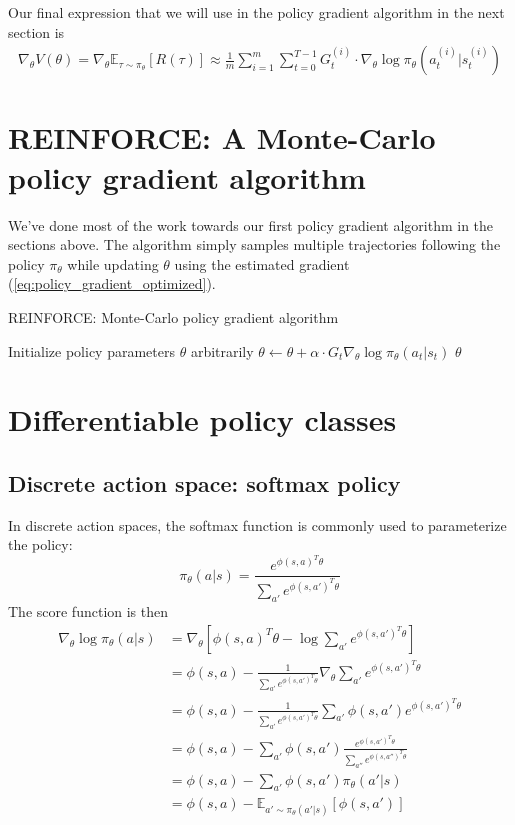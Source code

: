 \documentclass{article}
\newcommand{\E}{\mathbb{E}}                                        %
\begin{document}
Our final expression that we will use in the policy gradient algorithm in the next section is
\begin{align} \label{eq:policy_gradient_optimized}
\nabla_\theta V(\theta)
= \nabla_\theta \E_{\tau \sim \pi_\theta} [R(\tau)]
\approx \frac{1}{m} \sum_{i=1}^m \sum_{t=0}^{T-1} G_t^{(i)} \cdot \nabla_\theta \log \pi_\theta(a_t^{(i)} | s_t^{(i)})
\end{align}

\section{REINFORCE: A Monte-Carlo policy gradient algorithm}
We've done most of the work towards our first policy gradient algorithm in the sections above. The algorithm simply samples multiple trajectories following the policy $\pi_\theta$ while updating $\theta$ using the estimated gradient (\ref{eq:policy_gradient_optimized}).

\begin{algorithm}[H] %
\caption{REINFORCE: Monte-Carlo policy gradient algorithm}\label{alg:reinforce}
\begin{algorithmic}[1]
\State Initialize policy parameters $\theta$ arbitrarily
        \State $\theta \leftarrow \theta + \alpha \cdot G_t \nabla_\theta \log \pi_\theta(a_t | s_t)$
    \EndFor
\EndFor
\Return $\theta$
\EndProcedure
\end{algorithmic}
\end{algorithm}

\section{Differentiable policy classes}
\subsection{Discrete action space: softmax policy}
In discrete action spaces, the softmax function is commonly used to parameterize the policy:
\[ \pi_\theta(a|s) = \frac{ e^{\phi(s,a)^T \theta} }{ \sum_{a'} e^{\phi(s,a')^T \theta} } \]
The score function is then
\begin{align*}
\nabla_\theta \log \pi_\theta(a|s)
&= \nabla_\theta \left[ \phi(s,a)^T \theta - \log \sum_{a'} e^{\phi(s,a')^T \theta} \right] \\
&= \phi(s,a) - \frac{1}{\sum_{a'} e^{\phi(s,a')^T \theta}} \nabla_\theta \sum_{a'} e^{\phi(s,a')^T \theta} \\
&= \phi(s,a) - \frac{1}{\sum_{a'} e^{\phi(s,a')^T \theta}} \sum_{a'} \phi(s,a') e^{\phi(s,a')^T \theta} \\
&= \phi(s,a) - \sum_{a'} \phi(s, a') \frac{ e^{\phi(s,a')^T \theta} }{ \sum_{a''} e^{\phi(s,a'')^T \theta} } \\
&= \phi(s,a) - \sum_{a'} \phi(s, a') \pi_\theta(a'|s) \\
&= \phi(s,a) - \E_{a' \sim \pi_\theta(a'|s)} [ \phi(s, a')]
\end{align*}
\end{document}

